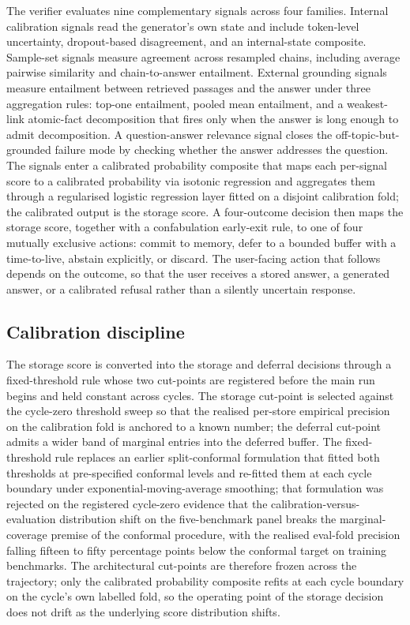 The verifier evaluates nine complementary signals across four families. Internal calibration signals read the generator's own state and include token-level uncertainty, dropout-based disagreement, and an internal-state composite. Sample-set signals measure agreement across resampled chains, including average pairwise similarity and chain-to-answer entailment. External grounding signals measure entailment between retrieved passages and the answer under three aggregation rules: top-one entailment, pooled mean entailment, and a weakest-link atomic-fact decomposition that fires only when the answer is long enough to admit decomposition. A question-answer relevance signal closes the off-topic-but-grounded failure mode by checking whether the answer addresses the question. The signals enter a calibrated probability composite that maps each per-signal score to a calibrated probability via isotonic regression and aggregates them through a regularised logistic regression layer fitted on a disjoint calibration fold; the calibrated output is the storage score. A four-outcome decision then maps the storage score, together with a confabulation early-exit rule, to one of four mutually exclusive actions: commit to memory, defer to a bounded buffer with a time-to-live, abstain explicitly, or discard. The user-facing action that follows depends on the outcome, so that the user receives a stored answer, a generated answer, or a calibrated refusal rather than a silently uncertain response.

\subsection{Calibration discipline}
\label{sec:calibration-discipline}

The storage score is converted into the storage and deferral decisions through a fixed-threshold rule whose two cut-points are registered before the main run begins and held constant across cycles. The storage cut-point is selected against the cycle-zero threshold sweep so that the realised per-store empirical precision on the calibration fold is anchored to a known number; the deferral cut-point admits a wider band of marginal entries into the deferred buffer. The fixed-threshold rule replaces an earlier split-conformal formulation that fitted both thresholds at pre-specified conformal levels and re-fitted them at each cycle boundary under exponential-moving-average smoothing; that formulation was rejected on the registered cycle-zero evidence that the calibration-versus-evaluation distribution shift on the five-benchmark panel breaks the marginal-coverage premise of the conformal procedure, with the realised eval-fold precision falling fifteen to fifty percentage points below the conformal target on training benchmarks. The architectural cut-points are therefore frozen across the trajectory; only the calibrated probability composite refits at each cycle boundary on the cycle's own labelled fold, so the operating point of the storage decision does not drift as the underlying score distribution shifts.

